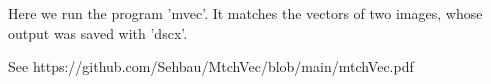 Here we run the program 'mvec'. It matches the vectors of two images, whose output
was saved with 'dscx'.

See https://github.com/Sehbau/MtchVec/blob/main/mtchVec.pdf
